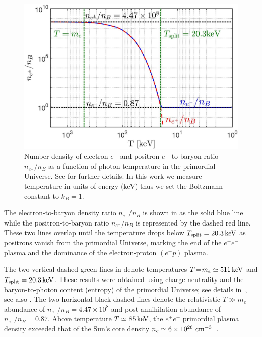 \begin{figure}[ht]
 \centering
\includegraphics[width=0.90\linewidth]{plots/EEPlasmaDensityRatio_new01.jpg}
 \caption{Number density of electron $e^{-}$ and positron $e^{+}$ to baryon ratio $n_{e^{\pm}}/n_{B}$ as a function of photon temperature in the primordial Universe. See  for further details. In this work we measure temperature in units of energy (keV) thus we set the Boltzmann constant to $k_{B}=1$. }
 \label{fig:densityratio} 
\end{figure}

The electron-to-baryon density ratio $n_{e^{-}}/n_{B}$ is shown in  as the solid blue line while the positron-to-baryon ratio $n_{e^{+}}/n_{B}$ is represented by the dashed red line. These two lines overlap until the temperature drops below $T_\mathrm{split}=20.3\text{\,keV}$ as positrons vanish from the primordial Universe, marking the end of the $e^{+}e^{-}$ plasma and the dominance of the electron-proton $(e^{-}p)$ plasma. 

The two vertical dashed green lines in  denote temperatures $T\!=\!m_{e}\simeq511\text{\,keV}$ and $T_\mathrm{split}=20.3\text{\,keV}$. These results were obtained using charge neutrality and the baryon-to-photon content (entropy) of the primordial Universe; see details in~\cite{Rafelski:2023emw}, see also . The two horizontal black dashed lines denote the relativistic $T\gg m_e$ abundance of $n_{e^{\pm}}/n_{B}=4.47\times10^{8}$ and post-annihilation abundance of $n_{e^{-}}/n_{B}=0.87$. Above temperature $T\simeq85\text{\,keV}$, the $e^{+}e^{-}$ primordial plasma density exceeded that of the Sun's core density $n_{e}\simeq6\times10^{26}{\rm\ cm}^{-3}$~\cite{Bahcall:2001smc}. 

